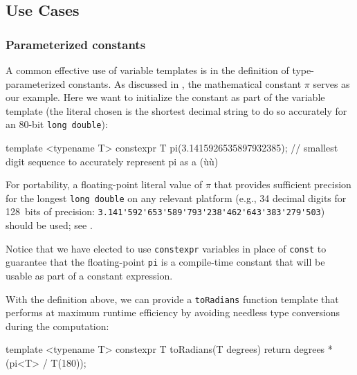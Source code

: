 \subsection[Use Cases]{Use Cases}\label{variabletemplate-use-cases}

\subsubsection[Parameterized constants]{Parameterized constants}\label{parametrized-constants}

A common effective use of variable templates is in the definition of
type-parameterized constants. As discussed in ,
the mathematical
constant $\pi$ serves as our example. Here we want to
initialize the constant as part of the variable template (the literal
chosen is the shortest decimal string to do so accurately for an 80-bit
\lstinline!long!~\lstinline!double!):

\begin{emcppslisting}[emcppsbatch=e4]
template <typename T>
constexpr T pi(3.1415926535897932385);
    // smallest digit sequence to accurately represent pi as a (ù{}ù)
\end{emcppslisting}

\noindent For
portability, a floating-point literal value of \(\pi\) that provides
sufficient precision for the longest \lstinline!long!~\lstinline!double! on
any relevant platform (e.g., 34 decimal digits for 128~bits of precision:
\lstinline!3.141'592'653'589'793'238'462'643'383'279'503!) should be
  used; see .

Notice that we have elected to use \lstinline!constexpr! variables in place of  \lstinline!const! to guarantee that the floating-point \lstinline!pi! is a compile-time constant that will be usable as part of a constant expression.

\newpage%
With the definition above, we can provide a
\lstinline!toRadians! function template that performs at maximum runtime
efficiency by avoiding needless type conversions during the computation:

\begin{emcppslisting}[emcppsbatch=e4]
template <typename T>
constexpr T toRadians(T degrees)
{
    return degrees * (pi<T> / T(180));
}
\end{emcppslisting}


